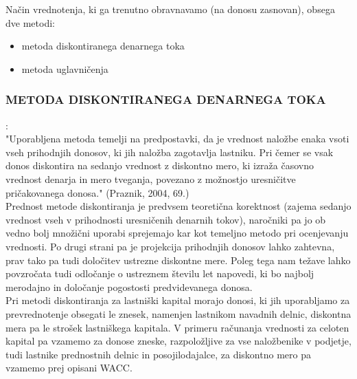\documentclass[12pt,a4paper]{amsart}
\theoremstyle{definition} %
\theoremstyle{plain} %
\begin{document}
Način vrednotenja, ki ga trenutno obravnavamo (na donosu zasnovan), obsega dve metodi:
\begin{itemize}
\item metoda diskontiranega denarnega toka
\item metoda uglavničenja
\end{itemize}


\subsubsection{METODA DISKONTIRANEGA DENARNEGA TOKA}:\\
"Uporabljena metoda temelji na predpostavki, da je vrednost naložbe enaka vsoti vseh prihodnjih donosov, ki jih naložba zagotavlja lastniku. Pri čemer se vsak donos diskontira na sedanjo vrednost z diskontno mero, ki izraža časovno vrednost denarja in mero tveganja, povezano z možnostjo uresničitve pričakovanega donosa." (Praznik, 2004, 69.)\\
Prednost metode diskontiranja je predvsem teoretična korektnost (zajema sedanjo vrednost vseh v prihodnosti uresničenih denarnih tokov), naročniki pa jo ob vedno bolj množični uporabi sprejemajo kar kot temeljno metodo pri ocenjevanju vrednosti. Po drugi strani pa je projekcija prihodnjih donosov lahko zahtevna, prav tako pa tudi določitev ustrezne diskontne mere. Poleg tega nam težave lahko povzročata tudi odločanje o ustreznem številu let napovedi, ki bo najbolj merodajno in določanje pogostosti predvidevanega donosa.\\
Pri metodi diskontiranja za lastniški kapital morajo donosi, ki jih uporabljamo za prevrednotenje obsegati le znesek, namenjen lastnikom navadnih delnic, diskontna mera pa le strošek lastniškega kapitala. V primeru računanja vrednosti za celoten kapital pa vzamemo za donose zneske, razpoložljive za vse naložbenike v podjetje, tudi lastnike prednostnih delnic in posojilodajalce, za diskontno mero pa vzamemo prej opisani WACC. \\
\end{document}
